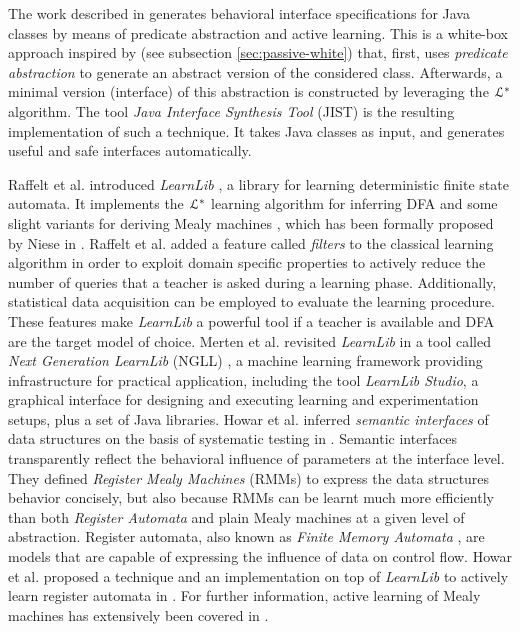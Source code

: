 The work described in \cite{Alur:2005:SIS:1047659.1040314}
generates behavioral interface specifications for Java classes by
means of predicate abstraction and active learning. This is a
white-box approach inspired by
\cite{Whaley:2002:AEO:566171.566212} (see subsection
\ref{sec:passive-white}) that, first, uses \textit{predicate
abstraction} to generate an abstract version of the considered
class. Afterwards, a minimal version (interface) of this
abstraction is constructed by leveraging the $\EuScript{L}^*$
algorithm. The tool \textit{Java Interface Synthesis Tool} (JIST)
is the resulting implementation of such a technique. It takes
Java classes as input, and generates useful and safe interfaces
automatically.

Raffelt et al. introduced \textit{LearnLib}
\cite{Raffelt:2005:LLA:1081180.1081189}, a library for learning
deterministic finite state automata. It implements the
$\EuScript{L}^*$ \cite{Angluin198787} learning algorithm for
inferring DFA and some slight variants for deriving Mealy
machines \cite{6771467}, which has been formally proposed by
Niese in \cite{DBLP:phd/de/Niese2003}.  Raffelt et al. added a
feature called \textit{filters} to the classical learning
algorithm in order to exploit domain specific properties to
actively reduce the number of queries that a teacher is asked
during a learning phase.
Additionally, statistical data acquisition can be employed to
evaluate the learning procedure. These features make
\textit{LearnLib} a powerful tool if a teacher is available and
DFA are the target model of choice.  Merten et al. revisited
\textit{LearnLib} in a tool called \textit{Next Generation
LearnLib} (NGLL) \cite{ngll11}, a machine learning framework
providing infrastructure for practical application, including the
tool \textit{LearnLib Studio}, a graphical interface for
designing and executing learning and experimentation setups, plus
a set of Java libraries. Howar et al. inferred \textit{semantic
interfaces} of data structures on the basis of systematic testing
in \cite{howar2012}. Semantic interfaces transparently reflect
the behavioral influence of parameters at the interface level.
They defined \textit{Register Mealy Machines} (RMMs) to express
the data structures behavior concisely, but also because RMMs can
be learnt much more efficiently than both \textit{Register
Automata} and plain Mealy machines at a given level of
abstraction. Register automata, also known as \textit{Finite
Memory Automata} \cite{Kaminski1994329}, are models that are
capable of expressing the influence of data on control flow.
Howar et al. proposed a technique and an implementation on top of
\textit{LearnLib} to actively learn register automata in
\cite{howarRA2012}. For further information, active learning of
Mealy machines has extensively been covered in \cite{steffen11}.


